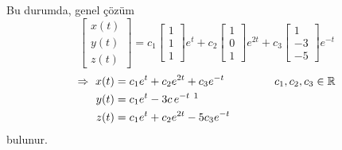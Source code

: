 \documentclass[11pt,a4paper]{article}
\begin{document}
\begin{cozum}
Bu durumda, genel çözüm
\[
\begin{bmatrix} x(t) \\ y(t) \\ z(t) \end{bmatrix} = c_1\begin{bmatrix} 1 \\ 1 \\ 1 \end{bmatrix}e^{t} + c_2\begin{bmatrix} 1 \\ 0 \\ 1 \end{bmatrix}e^{2t} + c_3\begin{bmatrix} 1 \\ -3 \\ -5 \end{bmatrix}e^{-t}
\]
\[
\Rightarrow \ \begin{aligned}[t] x(t) &= c_1e^{t} + c_2e^{2t} + c_3e^{-t} \\ y(t) &= c_1e^{t} - 3c\,e^{-t}\ \text{\footnotemark} \\ z(t) &= c_1e^{t} + c_2e^{2t} - 5c_3e^{-t} \end{aligned} \qquad\qquad c_1, c_2, c_3 \in \mathbb{R}
\]
bulunur.
\end{cozum}
\end{document}
